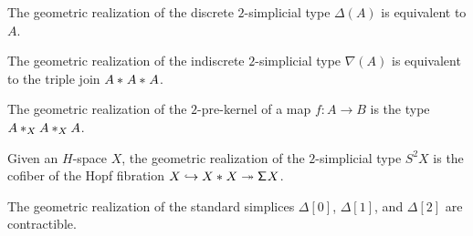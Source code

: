 \begin{cor}
The geometric realization of the discrete $2$-simplicial type $\Delta(A)$ is equivalent to $A$.
\end{cor}

\begin{cor}
The geometric realization of the indiscrete $2$-simplicial type $\nabla(A)$ is equivalent to the triple join $\join{A}{\join{A}{A}}$. 
\end{cor}

\begin{cor}
The geometric realization of the $2$-pre-kernel of a map $f:A\to B$ is the type $\join[X]{A}{\join[X]{A}{A}}$. 
\end{cor}

\begin{cor}
Given an $H$-space $X$, the geometric realization of the $2$-simplicial type $S^2 X$ is the cofiber of the Hopf fibration $X \hookrightarrow \join{X}{X} \twoheadrightarrow \susp X$.
\end{cor}

\begin{cor}
The geometric realization of the standard simplices $\Delta[0]$, $\Delta[1]$, and $\Delta[2]$ are contractible.
\end{cor}
